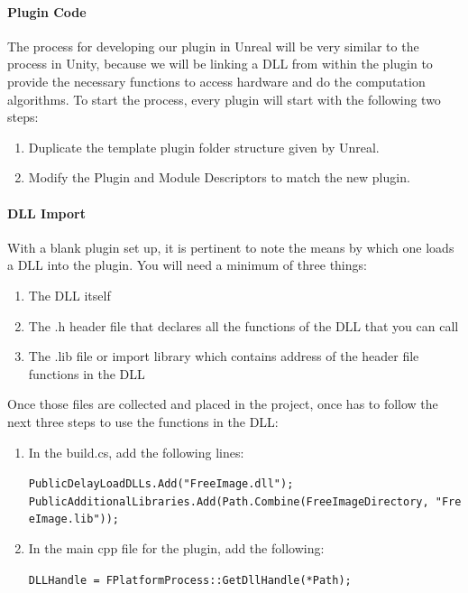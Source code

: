 \documentclass[12pt]{article}
\providecommand{\tightlist}{%
  \setlength{\itemsep}{0pt}\setlength{\parskip}{0pt}}
\begin{document}
\paragraph{Plugin Code}\label{plugin-code}

The process for developing our plugin in Unreal will be very similar to
the process in Unity, because we will be linking a DLL from within the
plugin to provide the necessary functions to access hardware and do the
computation algorithms. To start the process, every plugin will start
with the following two steps:

\begin{enumerate}
\def\labelenumi{\arabic{enumi}.}
\tightlist
\item
  Duplicate the template plugin folder structure given by Unreal.
\item
  Modify the Plugin and Module Descriptors to match the new plugin.
\end{enumerate}

\paragraph{DLL Import}\label{dll-import}

With a blank plugin set up, it is pertinent to note the means by which
one loads a DLL into the plugin. You will need a minimum of three
things:

\begin{enumerate}
\def\labelenumi{\arabic{enumi}.}
\tightlist
\item
  The DLL itself
\item
  The .h header file that declares all the functions of the DLL that you
  can call
\item
  The .lib file or import library which contains address of the header
  file functions in the DLL
\end{enumerate}

Once those files are collected and placed in the project, once has to
follow the next three steps to use the functions in the DLL:

\begin{enumerate}
\def\labelenumi{\arabic{enumi}.}
\item
  In the build.cs, add the following lines:

  \texttt{PublicDelayLoadDLLs.Add("FreeImage.dll");}
  \texttt{PublicAdditionalLibraries.Add(Path.Combine(FreeImageDirectory,\ "FreeImage.lib"));}
\item
  In the main cpp file for the plugin, add the following:

  \texttt{DLLHandle\ =\ FPlatformProcess::GetDllHandle(*Path);}
\end{enumerate}
\end{document}

